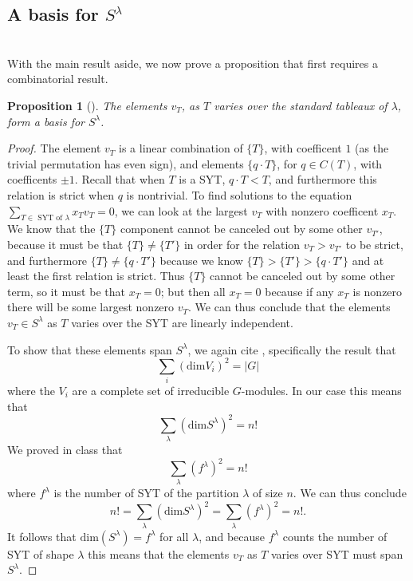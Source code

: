 \documentclass[12pt,twoside]{reedthesis}
\theoremstyle{plain}   %
\newtheorem{prop}{Proposition}[section]
\theoremstyle{definition}
\theoremstyle{remark}
\numberwithin{equation}{section}
\def\dim{\mathrm{dim}}
\begin{document}
  \subsection{A basis for $S^\lambda$} \hfill\\
  With the main result aside, we now prove a proposition that first requires a combinatorial result.
  \begin{prop}[{\cite[Pg. 88]{fulton}}]\label{prop1}
    The elements $v_T$, as $T$ varies over the \emph{standard} tableaux  of $\lambda$, form a basis for $S^\lambda$.
  \end{prop}
  \begin{proof}
    The element $v_T$ is a linear combination of $\{T\}$, with coefficent $1$ (as the trivial permutation has even sign),
    and elements $\{q \cdot T\}$, for $q \in C(T)$, with coefficents $\pm 1$.
    Recall that when $T$ is a SYT, $q \cdot T < T$, and furthermore this relation is strict when $q$ is nontrivial.
    To find solutions to the equation $\sum_{T \in \text{ SYT of $\lambda$}} x_Tv_T = 0$,
    we can look at the largest $v_T$ with nonzero coefficent $x_T$.
    We know that the $\{T\}$ component cannot be canceled out by some other $v_{T'}$, because it must be that $\{T\} \neq \{T'\}$ in
    order for the relation $v_T > v_{T'}$ to be strict,
    and furthermore $\{T\} \neq \{q \cdot T'\}$ because we know $\{ T\} > \{T'\} > \{q \cdot T'\}$ and at least the first relation is strict.
    Thus $\{T\}$ cannot be canceled out by some other term, so it must be that $x_T = 0$; but then all $x_T = 0$ because
    if any $x_T$ is nonzero there will be some largest nonzero $v_T$.
    We can thus conclude that the elements $v_T \in S^\lambda$ as $T$ varies over the SYT are linearly independent. \par
    To show that these elements span $S^\lambda$, we again cite \cite[Proposition 1.10.1]{sagan}, specifically the result
    that
    \[ \sum_i (\dim V_i)^2 =|G| \]
    where the $V_i$ are a complete set of irreducible $G$-modules.
    In our case this means that
    \[\sum_\lambda (\dim S^\lambda)^2 = n!\]
    We proved in class that 
    \[ \sum_\lambda(f^\lambda)^2 = n!\]
    where $f^\lambda$ is the number of SYT of the partition $\lambda$ of size $n$.
    We can thus conclude
    \[ n! = \sum_\lambda (\dim S^\lambda)^2 = \sum_\lambda(f^\lambda)^2 = n!.\]
    It follows that $\dim(S^\lambda) = f^\lambda$ for all $\lambda$, and because $f^\lambda$ counts the number of SYT of shape $\lambda$
    this means that the elements $v_T$ as $T$ varies over SYT must span $S^\lambda$.
  \end{proof}
\end{document}
